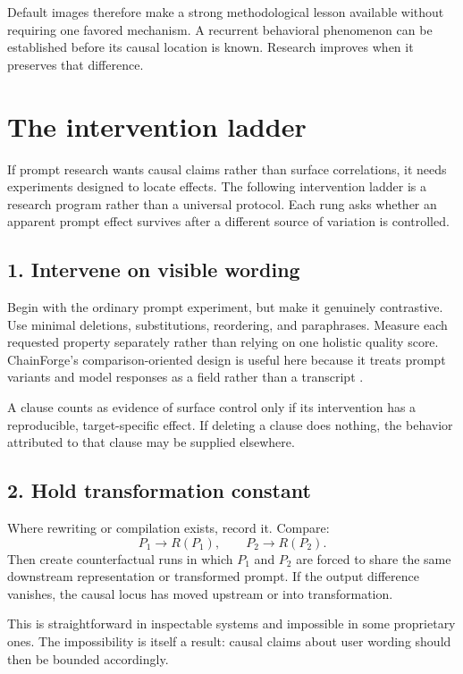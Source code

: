 \documentclass[11pt]{article}
\begin{document}
Default images therefore make a strong methodological lesson available without requiring one favored mechanism. A recurrent behavioral phenomenon can be established before its causal location is known. Research improves when it preserves that difference.

\section{The intervention ladder}

If prompt research wants causal claims rather than surface correlations, it needs experiments designed to locate effects. The following intervention ladder is a research program rather than a universal protocol. Each rung asks whether an apparent prompt effect survives after a different source of variation is controlled.

\subsection{1. Intervene on visible wording}

Begin with the ordinary prompt experiment, but make it genuinely contrastive. Use minimal deletions, substitutions, reordering, and paraphrases. Measure each requested property separately rather than relying on one holistic quality score. ChainForge's comparison-oriented design is useful here because it treats prompt variants and model responses as a field rather than a transcript \citep{Arawjo2023ChainForge}.

A clause counts as evidence of surface control only if its intervention has a reproducible, target-specific effect. If deleting a clause does nothing, the behavior attributed to that clause may be supplied elsewhere.

\subsection{2. Hold transformation constant}

Where rewriting or compilation exists, record it. Compare:
\[
P_1 \rightarrow R(P_1), \qquad P_2 \rightarrow R(P_2).
\]
Then create counterfactual runs in which \(P_1\) and \(P_2\) are forced to share the same downstream representation or transformed prompt. If the output difference vanishes, the causal locus has moved upstream or into transformation.

This is straightforward in inspectable systems and impossible in some proprietary ones. The impossibility is itself a result: causal claims about user wording should then be bounded accordingly.
\end{document}
